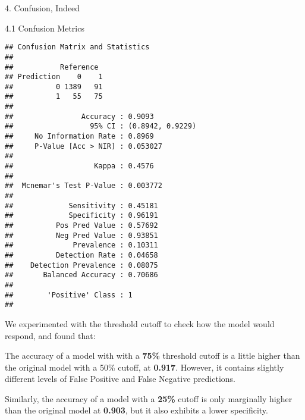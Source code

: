 \documentclass[
  ignorenonframetext,
]{beamer}
\newenvironment{Shaded}{\begin{snugshade}}{\end{snugshade}}
\newcommand{\AttributeTok}[1]{\textcolor[rgb]{0.77,0.63,0.00}{#1}}
\newcommand{\DecValTok}[1]{\textcolor[rgb]{0.00,0.00,0.81}{#1}}
\newcommand{\FunctionTok}[1]{\textcolor[rgb]{0.00,0.00,0.00}{#1}}
\newcommand{\NormalTok}[1]{#1}
\newcommand{\OtherTok}[1]{\textcolor[rgb]{0.56,0.35,0.01}{#1}}
\newcommand{\SpecialCharTok}[1]{\textcolor[rgb]{0.00,0.00,0.00}{#1}}
\newcommand{\StringTok}[1]{\textcolor[rgb]{0.31,0.60,0.02}{#1}}
\begin{document}
\begin{frame}[fragile]{4. Confusion, Indeed}
\begin{block}{4.1 Confusion Metrics}
\begin{verbatim}
## Confusion Matrix and Statistics
## 
##           Reference
## Prediction    0    1
##          0 1389   91
##          1   55   75
##                                           
##                Accuracy : 0.9093          
##                  95% CI : (0.8942, 0.9229)
##     No Information Rate : 0.8969          
##     P-Value [Acc > NIR] : 0.053027        
##                                           
##                   Kappa : 0.4576          
##                                           
##  Mcnemar's Test P-Value : 0.003772        
##                                           
##             Sensitivity : 0.45181         
##             Specificity : 0.96191         
##          Pos Pred Value : 0.57692         
##          Neg Pred Value : 0.93851         
##              Prevalence : 0.10311         
##          Detection Rate : 0.04658         
##    Detection Prevalence : 0.08075         
##       Balanced Accuracy : 0.70686         
##                                           
##        'Positive' Class : 1               
## 
\end{verbatim}

We experimented with the threshold cutoff to check how the model would
respond, and found that:

The accuracy of a model with with a \textbf{75\%} threshold cutoff is a
little higher than the original model with a 50\% cutoff, at
\textbf{0.917}. However, it contains slightly different levels of False
Positive and False Negative predictions.

Similarly, the accuracy of a model with a \textbf{25\%} cutoff is only
marginally higher than the original model at \textbf{0.903}, but it also
exhibits a lower specificity.

\begin{Shaded}
\end{Shaded}


\end{block}
\end{frame}
\end{document}
